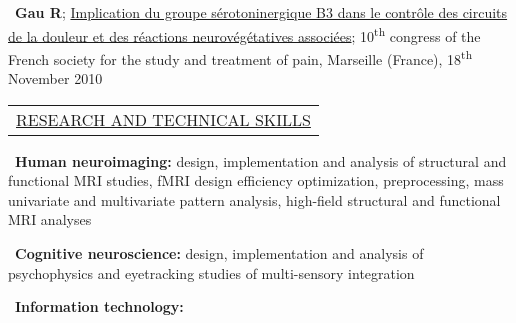 \documentclass[a4paper,12pt,oneside]{letter}
\begin{document}
{\textbullet~\textbf{Gau R}; \href{http://www.researchgate.net/profile/Remi_Gau/publication/312084405_Implication_du_groupe_serotoninergique_B3_dans_le_controle_des_circuits_de_la_douleur_et_des_reactions_neurovegetatives_associees/links/586e5f4a08ae6eb871bcfcc2?origin=publication_detail&ev=pub_int_prw_xdl&msrp=fq7qspniFbcYB53CbrroAtz2DNXxUJar7CmckJaw6O2YzI7LWasFAW99t9G74Z5sL-KLoJT2Dqv8D075R3ghy55Fy6xPne3_ARZvM87O3Ao.5ii75N_9y4vKCns-VUuTTDNhKb6ruhYALqaObgtdOB4WIkUSArh9tdzN9AtPRWz68YGcjTb3scxfWZy6tYxnSg.naSDUCbUZHM6gF6BaFbjpF3ARcyIPTBh1UsuA1cVoOZQsoPMn9YGNC2UsgdGA0P28xoO8bXY1221-tRVtfrUZA}{Implication du groupe sérotoninergique B3 dans le contrôle des circuits de la douleur et des réactions neurovégétatives associées}; 10\textsuperscript{th} congress of the French society for the study and treatment of pain, Marseille (France), 18\textsuperscript{th} November 2010


\medskip 

\begin{tabular}{B}
\underline{RESEARCH AND TECHNICAL SKILLS}
\end{tabular}


\textbullet~\textbf{Human neuroimaging:} design, implementation and analysis of structural and functional MRI studies, fMRI design efficiency optimization, preprocessing, mass univariate and multivariate pattern analysis, high-field structural and functional MRI analyses

\textbullet~\textbf{Cognitive neuroscience:} design, implementation and analysis of psychophysics and eyetracking studies of multi-sensory integration 

\pagebreak

\textbullet~\textbf{Information technology:}

}
\end{document}
